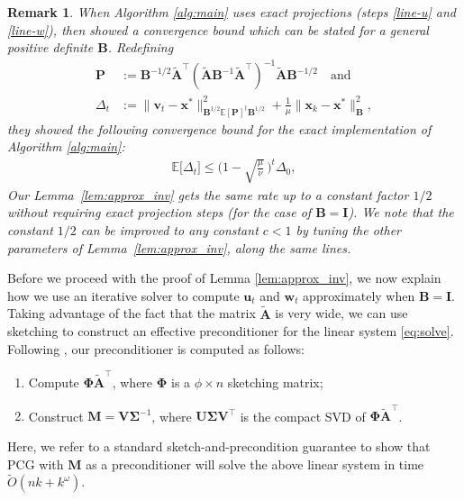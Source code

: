 \documentclass[11pt]{article}
\let\origtop\top
\renewcommand\top{{\scriptscriptstyle{\origtop}}}
\def\x{{\mathbf x}}
\def\w{{\mathbf w}}
\def\v{{\mathbf v}}
\def\u{{\mathbf u}}
\def\A{{\mathbf A}}
\def\B{{\mathbf B}}
\def\Sigmab{{\mathbf \Sigma}}
\def\I{{\mathbf I}}
\def\M{{\mathbf M}}
\def\V{{\mathbf V}}
\def\P{{\mathbf P}}
\def\E{{\mathds E}}
\def\U{{\mathbf U}}
\newtheorem{remark}[thm]{Remark}
\begin{document}
\begin{remark}\label{r:exact-analysis}
    When Algorithm \ref{alg:main} uses exact projections (steps \ref{line-u} and \ref{line-w}), then \cite{gower2018accelerated} showed a convergence bound which can be stated for a general positive definite $\B$. Redefining
    \begin{align*}
        \P &:= \B^{-1/2}\tilde\A^\top(\tilde\A\B^{-1}\tilde\A^\top)^{-1}\tilde\A\B^{-1/2}
        \quad\text{and}
        \\        
        \Delta_t &:= \|\v_t-\x^*\|_{\B^{1/2}\E[\P]^\dagger\B^{1/2}}^2
        +\frac1{\mu}\|\x_k-\x^*\|_{\B}^2,
    \end{align*}    
    they showed the following convergence bound for the exact implementation of Algorithm \ref{alg:main}:
 \begin{align*}
\E\big[\Delta_t\big] \leq \bigg(1-\sqrt{\frac{\mu}{\nu}}\,\bigg)^t\Delta_0,
\end{align*}
    Our Lemma~\ref{lem:approx_inv} gets the same rate up to a constant factor $1/2$ without requiring exact projection steps (for the case of $\B=\I$). We note that the constant $1/2$ can be improved to any constant $c < 1$ by tuning the other parameters of Lemma~\ref{lem:approx_inv}, along the same lines.
\end{remark}
Before we proceed with the proof of Lemma \ref{lem:approx_inv}, we now explain how we  use an iterative solver to compute $\u_t$ and $\w_t$ approximately when $\B=\I$. Taking advantage of the fact that the matrix $\tilde\A$ is very wide, we can use sketching to construct an effective preconditioner for the linear system \eqref{eq:solve}. Following \cite{derezinski2023solving}, our preconditioner is computed as follows:
\begin{enumerate}
    \item Compute $\mathbf{\Phi}\tilde\A^\top$, where $\mathbf{\Phi}$ is a $\phi\times n$ sketching matrix;
    \item Construct $\M=\V\Sigmab^{-1}$, where $\U\Sigmab\V^\top$ is the compact SVD of $\mathbf{\Phi}\tilde\A^\top$.
\end{enumerate}
Here, we refer to a standard sketch-and-precondition guarantee to show that PCG with $\M$ as a preconditioner will solve the above linear system in time $\tilde O(nk+k^\omega)$.
\end{document}
